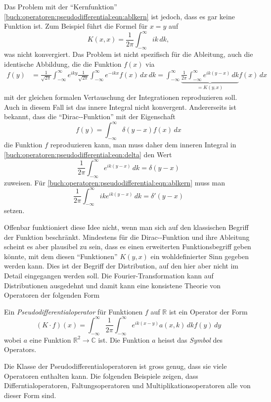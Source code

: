 Das Problem mit der ``Kernfunktion''
\eqref{buch:operatoren:pseudodifferential:eqn:ablkern}
ist jedoch, dass es gar keine Funktion ist.
Zum Beispiel führt die Formel für $x=y$ auf
\[
K(x,x)
=
\frac{1}{2\pi}
\int_{-\infty}^\infty 
ik\,dk,
\]
was nicht konvergiert.
Das Problem ist nicht spezifisch für die Ableitung, auch die identische
Abbildung, die die Funktion $f(x)$ via
\begin{align}
f(y)
&=
\frac{1}{\!\sqrt{2\pi}}
\int_{-\infty}^\infty
e^{iky}
\frac{1}{\!\sqrt{2\pi}}
\int_{-\infty}^\infty
e^{-ikx}
f(x)
\,dx
\,dk
=
\int_{-\infty}^\infty
\underbrace{
\frac{1}{2\pi}
\int_{-\infty}^\infty
e^{ik(y-x)}
\,dk
}_{\displaystyle = K(y,x)}
f(x)
\,dx
\label{buch:operatoren:pseudodifferential:eqn:delta}
\end{align}
mit der gleichen formalen Vertauschung der Integrationen reproduzieren
soll.
Auch in diesem Fall ist das innere Integral nicht konvergent.
Andererseits ist bekannt, dass die ``Dirac-\textdelta-Funktion'' 
mit der Eigenschaft
\[
f(y) = \int_{-\infty}^\infty \delta(y-x) f(x)\,dx
\]
die Funktion $f$ reproduzieren kann, man muss daher dem inneren
Integral in \eqref{buch:operatoren:pseudodifferential:eqn:delta} den
Wert
\[
\frac{1}{2\pi}
\int_{-\infty}^\infty e^{ik(y-x)} \,dk
=
\delta (y-x)
\]
zuweisen.
Für
\eqref{buch:operatoren:pseudodifferential:eqn:ablkern}
muss man
\[
\frac{1}{2\pi}
\int_{-\infty}^\infty ike^{ik(y-x)} \,dk
=
\delta'(y-x)
\]
setzen.

Offenbar funktioniert diese Idee nicht, wenn man sich auf den 
klassischen Begriff der Funktion beschränkt.
Mindestens für die Dirac-\textdelta-Funktion und ihre Ableitung
scheint es aber plausibel zu sein, dass es einen erweiterten
Funktionsbegriff geben könnte, mit dem diesen ``Funktionen'' $K(y,x)$
ein wohldefinierter Sinn gegeben werden kann.
Dies ist der Begriff der Distribution, auf den hier aber nicht
im Detail eingegangen werden soll.
Die Fourier-Transformation kann auf Distributionen ausgedehnt und
damit kann eine konsistene Theorie von Operatoren der folgenden Form

\begin{definition}
Ein {\em Pseudodifferentialoperator} für Funktionen $f$ auf $\mathbb{R}$ ist
ein Operator der Form
\[
(K\cdot f)(x)
=
\int_{-\infty}^\infty
\frac{1}{2\pi}
\int_{-\infty}^\infty
e^{ik(x-y)}
a(x,k)
\,dk
f(y)\,dy
\]
wobei $a$ eine Funktion $\mathbb{R}^2\to\mathbb{C}$ ist.
Die Funktion $a$ heisst das {\em Symbol} des Operators.
\end{definition}

Die Klasse der Pseudodifferentialoperatoren ist gross genug, dass sie
viele Operatoren enthalten kann.
Die folgenden Beispiele zeigen, dass Differntialoperatoren,
Faltungsoperatoren und Multiplikationsoperatoren alle von dieser
Form sind.

